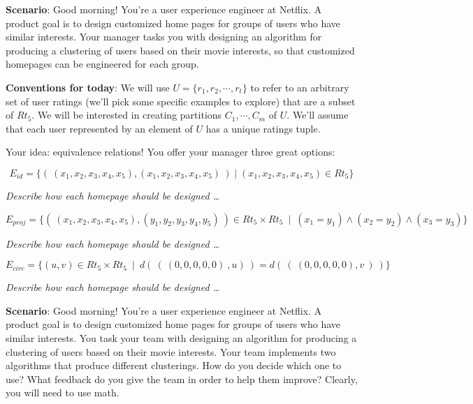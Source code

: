
{\bf Scenario}: Good morning! You're a user experience engineer at Netflix. A
product goal is to design customized home pages for groups of users who have
similar interests. Your manager tasks you with designing an algorithm for
producing a clustering of users based on their movie interests,
so that customized homepages can be engineered for each group.

{\bf Conventions for today}: 
We will use $U = \{r_1, r_2, \cdots, r_t\}$ to 
refer to an arbitrary set of user ratings (we'll pick some 
specific examples to explore) that are a subset of $Rt_5$. 
We will be interested in creating partitions $C_1, \cdots, C_m$ of 
$U$. We'll assume that each user represented by an element of $U$ 
has a unique ratings tuple.


Your idea: equivalence relations! You offer your manager three great options: 

\[
    E_{id} = \{ ( ~(x_1, x_2, x_3, x_4, x_5), (x_1, x_2, x_3, x_4, x_5)~) \mid 
    (x_1, x_2, x_3, x_4, x_5) \in Rt_5  \}
\]

{\it Describe how each homepage should be designed \ldots }

\vspace{100pt}



\[
    E_{proj} =  \{ ( ~(x_1, x_2, x_3, x_4, x_5), (y_1, y_2, y_3, y_4, y_5)~) \in
         Rt_5 \times Rt_5 ~\mid~(x_1 = y_1) \land  (x_2 = y_2) \land (x_3 = y_3) \}
\]


{\it Describe how each homepage should be designed \ldots }

\vspace{100pt}

\[
E_{circ} =  \{ (u,v) \in Rt_5 \times Rt_5 ~\mid~ d(~ ( ~(0,0,0,0,0)~, u)~ ) =  d( ~(~(0,0,0,0,0),v~)~) \}
\]

{\it Describe how each homepage should be designed \ldots }


\vspace{100pt}


{\bf Scenario}: Good morning! You're a user experience engineer at Netflix. A
product goal is to design customized home pages for groups of users who have
similar interests. You task your team with designing an algorithm for
producing a clustering of users based on their movie interests. Your team
implements two algorithms that produce different clusterings. How do you
decide which one to use? What feedback do you give the team in order to help
them improve? Clearly, you will need to use math.



